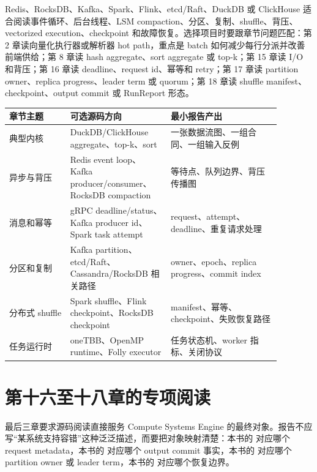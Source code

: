 Redis、RocksDB、Kafka、Spark、Flink、etcd/Raft、DuckDB 或 ClickHouse 适合阅读事件循环、后台线程、LSM compaction、分区、复制、shuffle、背压、vectorized execution、checkpoint 和故障恢复。选择项目时要跟章节问题匹配：第 2 章读向量化执行器或解析器 hot path，重点是 batch 如何减少每行分派并改善前端供给；第 8 章读 hash aggregate、sort aggregate 或 top-k；第 15 章读 I/O 和背压；第 16 章读 deadline、request id、幂等和 retry；第 17 章读 partition owner、replica progress、leader term 或 quorum；第 18 章读 shuffle manifest、checkpoint、output commit 或 RunReport 形态。

\begin{center}
\begin{tabular}{p{0.2\linewidth}p{0.32\linewidth}p{0.36\linewidth}}
\toprule
章节主题 & 可选源码方向 & 最小报告产出 \\
\midrule
典型内核 & DuckDB/ClickHouse aggregate、top-k、sort & 一张数据流图、一组合同、一组输入反例 \\
异步与背压 & Redis event loop、Kafka producer/consumer、RocksDB compaction & 等待点、队列边界、背压传播图 \\
消息和幂等 & gRPC deadline/status、Kafka producer id、Spark task attempt & request、attempt、deadline、重复请求处理 \\
分区和复制 & Kafka partition、etcd/Raft、Cassandra/RocksDB 相关路径 & owner、epoch、replica progress、commit index \\
分布式 shuffle & Spark shuffle、Flink checkpoint、RocksDB checkpoint & manifest、幂等、checkpoint、失败恢复路径 \\
任务运行时 & oneTBB、OpenMP runtime、Folly executor & 任务状态机、worker 指标、关闭协议 \\
\bottomrule
\end{tabular}
\end{center}

\section{第十六至十八章的专项阅读}

最后三章要求源码阅读直接服务 Compute Systems Engine 的最终对象。报告不应写“某系统支持容错”这种泛泛描述，而要把对象映射清楚：本书的  对应哪个 request metadata，本书的  对应哪个 output commit 事实，本书的  对应哪个 partition owner 或 leader term，本书的  对应哪个恢复边界。

